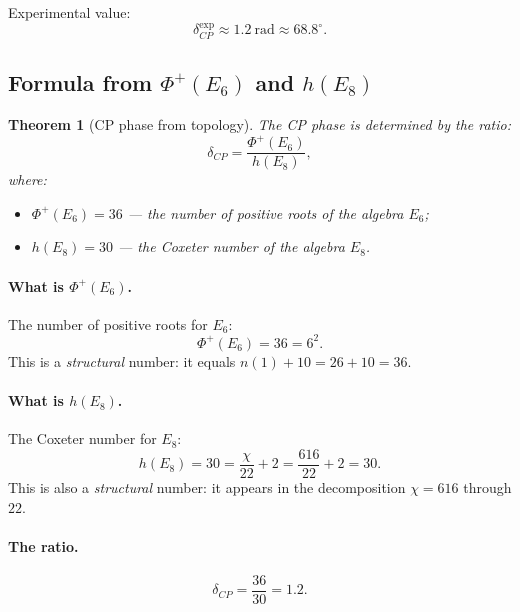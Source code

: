 \documentclass[11pt,a4paper]{article}
\newtheorem{theorem}{Theorem}[section]
\theoremstyle{definition}
\begin{document}
Experimental value:
\begin{equation}
    \delta_{CP}^{\text{exp}} \approx 1.2~\text{rad} \approx 68.8^\circ.
\end{equation}

\subsection{Formula from $\Phi^+(E_6)$ and $h(E_8)$}
\label{subsec:cp-formula}

\begin{theorem}[CP phase from topology]
\label{thm:cp-topology}
The CP phase is determined by the ratio:
\begin{equation}
    \delta_{CP} = \frac{\Phi^+(E_6)}{h(E_8)},
\end{equation}
where:
\begin{itemize}
    \item $\Phi^+(E_6) = 36$ — the number of \emph{positive roots} 
          of the algebra $E_6$;
    \item $h(E_8) = 30$ — the \emph{Coxeter number} of the algebra $E_8$.
\end{itemize}
\end{theorem}

\paragraph{What is $\Phi^+(E_6)$.}
The number of positive roots for $E_6$:
\begin{equation}
    \Phi^+(E_6) = 36 = 6^2.
\end{equation}
This is a \emph{structural} number: it equals $n(1) + 10 = 26 + 10 = 36$.

\paragraph{What is $h(E_8)$.}
The Coxeter number for $E_8$:
\begin{equation}
    h(E_8) = 30 = \frac{\chi}{22} + 2 = \frac{616}{22} + 2 = 30.
\end{equation}
This is also a \emph{structural} number: it appears in the decomposition 
$\chi = 616$ through $22$.

\paragraph{The ratio.}
\begin{equation}
    \boxed{
    \delta_{CP} = \frac{36}{30} = 1.2.
    }
\end{equation}
\end{document}
